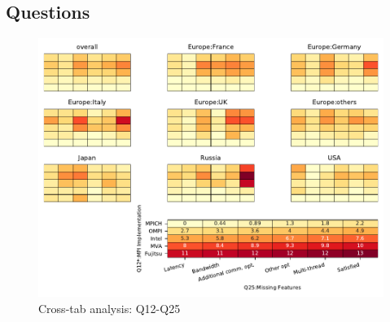 
\subsection{Questions}


\begin{figure}
\begin{center}
\includegraphics[width=12cm]{../pdfs/Q12-Q25.pdf}
\caption{Cross-tab analysis: Q12-Q25}
\label{fig:Q12-Q25}
\end{center}
\end{figure}
